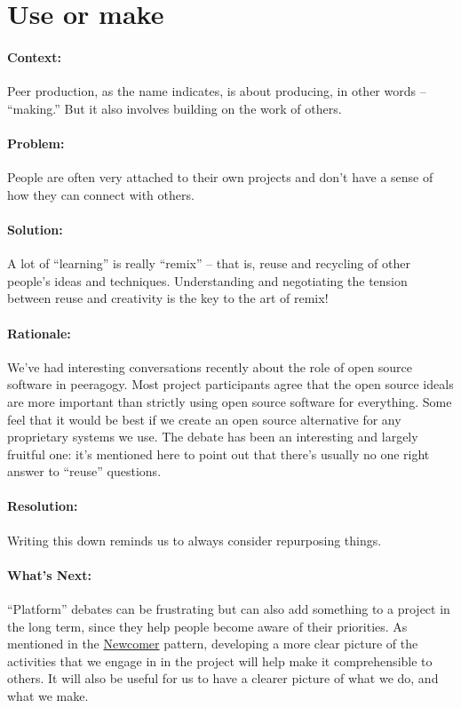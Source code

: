 \section{Use or make}
\paragraph{Context:}
Peer production, as the name indicates, is about producing, in other words --
``making.'' But it also involves building on the work of others.

\paragraph{Problem:}
People are often very attached to their own projects and don't have a sense of how they can connect with others.

\paragraph{Solution:} A lot of ``learning'' is really ``remix'' -- that is,
reuse and recycling of other people's ideas and techniques.
Understanding and negotiating the tension between reuse and creativity
is the key to the art of remix!

\paragraph{Rationale:} We've had interesting conversations recently about
the role of open source software in peeragogy. Most project participants
agree that the open source ideals are more important than strictly using
open source software for everything. Some feel that it would be best if
we create an open source alternative for any proprietary systems we use.
The debate has been an interesting and largely fruitful one: it's
mentioned here to point out that there's usually no one right answer to
``reuse'' questions.

\paragraph{Resolution:} Writing this down reminds us to always consider repurposing things.

\paragraph{What's Next:} ``Platform'' debates can be frustrating but can
also add something to a project in the long term, since they help people
become aware of their priorities. As mentioned in
the \href{http://peeragogy.org/patterns/newcomer/}{Newcomer} pattern,
developing a more clear picture of the activities that we engage in in
the project will help make it comprehensible to others. It will also be
useful for us to have a clearer picture of what we do, and what we make.

